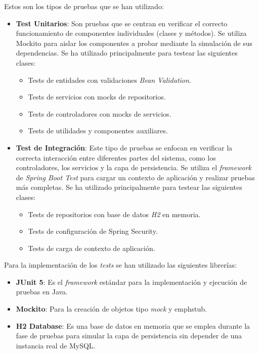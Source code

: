 Estos son los tipos de pruebas que se han utilizado:
\begin{itemize}
   \item \textbf{Test Unitarios}: Son pruebas que se centran en verificar el correcto funcionamiento de componentes individuales (clases y métodos). Se utiliza Mockito para aislar los componentes a probar mediante la simulación de sus dependencias. Se ha utilizado principalmente para testear las siguientes clases:
      \begin{itemize}
      \item Tests de entidades con validaciones \emph{Bean Validation}.
      \item Tests de servicios con mocks de repositorios.
      \item Tests de controladores con mocks de servicios.
      \item Tests de utilidades y componentes auxiliares.
   \end{itemize}
   \item \textbf{Test de Integración}: Este tipo de pruebas se enfocan en verificar la correcta interacción entre diferentes partes del sistema, como los controladores, los servicios y la capa de persistencia. Se utiliza el \emph{framework} de \textit{Spring Boot Test} para cargar un contexto de aplicación y realizar pruebas más completas. Se ha utilizado principalmente para testear las siguientes clases:
      \begin{itemize}
      \item Tests de repositorios con base de datos \textit{H2} en memoria.
      \item Tests de configuración de Spring Security.
      \item Tests de carga de contexto de aplicación.
   \end{itemize}
\end{itemize}

Para la implementación de los \emph{tests} se han utilizado las siguientes librerías:
\begin{itemize}
   \item \textbf{JUnit 5}: Es el \emph{framework} estándar para la implementación y ejecución de pruebas en Java.
   \item \textbf{Mockito}: Para la creación de objetos tipo \emph{mock} y emph{stub}.
   \item \textbf{H2 Database}: Es una base de datos en memoria que se emplea durante la fase de pruebas para simular la capa de persistencia sin depender de una instancia real de MySQL.
\end{itemize}

